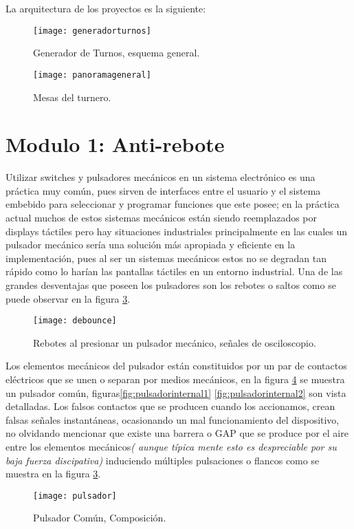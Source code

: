 \documentclass[a4paper]{article}
\begin{document}
La arquitectura de los proyectos es la siguiente:

\begin{figure}[H]
  \centering
     \texttt{[image: generadorturnos]}
  \caption{Generador de Turnos, esquema general.}
      \label{fig:debounce}
\end{figure}

\begin{figure}[H]
  \centering
     \texttt{[image: panoramageneral]}
  \caption{Mesas del turnero.}
      \label{fig:debounce}
\end{figure}

\clearpage
\newpage
\section{Modulo 1: Anti-rebote\label{antirebote}}
Utilizar switches y pulsadores mecánicos en un sistema electrónico es una práctica muy común, pues sirven de interfaces entre el usuario y el sistema embebido para seleccionar y programar funciones que este posee; en la práctica actual muchos de estos sistemas mecánicos están siendo reemplazados por displays táctiles pero hay situaciones industriales principalmente en las cuales un pulsador mecánico sería una solución más apropiada y eficiente en la implementación, pues al ser un sistemas mecánicos estos no se degradan tan rápido como lo harían las pantallas táctiles en un entorno industrial. Una de las grandes desventajas que poseen los pulsadores son los rebotes o saltos como se puede observar en la figura \ref{fig:debounce}.\\
\begin{figure}[H]
  \centering
     \texttt{[image: debounce]}
  \caption{Rebotes al presionar un pulsador mecánico, señales de osciloscopio.}
      \label{fig:debounce}
\end{figure}
Los elementos mecánicos del pulsador están constituidos por un par de contactos eléctricos que se unen o separan por medios mecánicos,  en la figura \ref{fig:pulsador} se muestra un pulsador común, figuras\ref{fig:pulsadorinternal1} \ref{fig:pulsadorinternal2} son vista detalladas. Los falsos contactos que se producen cuando los accionamos, crean falsas señales instantáneas, ocasionando un mal funcionamiento del dispositivo, no olvidando mencionar que existe una barrera o GAP que se produce por el aire entre los elementos mecánicos\textit{( aunque típica mente esto es despreciable por su baja fuerza discipativa)} induciendo múltiples pulsaciones o flancos como se muestra en la figura \ref{fig:debounce}. 
\begin{figure}[H]
  \centering
     \texttt{[image: pulsador]}
  \caption{Pulsador Común, Composición.}
      \label{fig:pulsador}
\end{figure}
\end{document}
